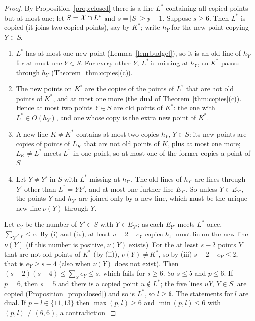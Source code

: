 \begin{proof}
By Proposition~\ref{prop:closed} there is a line $L^*$ containing all copied points but at most one; let
$S = \mathcal{X} \cap L^*$ and $s = |S| \ge p-1$. Suppose $s \ge 6$. Then $L^*$ is copied (it joins two copied points),
say by $K^*$; write $h_Y$ for the new point copying $Y \in S$.
\begin{enumerate}[label=(\roman*)]
\item $L^*$ has at most one new point (Lemma~\ref{lem:budget}), so it is an old line of $h_Y$ for at most one $Y \in S$.
For every other $Y$, $L^*$ is missing at $h_Y$, so $K^*$ passes through $h_Y$ (Theorem~\ref{thm:copies}(c)).
\item The new points on $K^*$ are the copies of the points of $L^*$ that are not old points of $K^*$, and at most one
more (the dual of Theorem~\ref{thm:copies}(c)). Hence at most two points $Y \in S$ are old points of $K^*$: the one with
$L^* \in O(h_Y)$, and one whose copy is the extra new point of $K^*$.
\item A new line $K \ne K^*$ contains at most two copies $h_Y$, $Y \in S$: its new points are copies of points of $L_K$
that are not old points of $K$, plus at most one more; $L_K \ne L^*$ meets $L^*$ in one point, so at most one of the
former copies a point of $S$.
\item Let $Y \ne Y'$ in $S$ with $L^*$ missing at $h_{Y'}$. The old lines of $h_{Y'}$ are lines through $Y'$ other than
$L^* = YY'$, and at most one further line $E_{Y'}$. So unless $Y \in E_{Y'}$, the points $Y$ and $h_{Y'}$ are joined only
by a new line, which must be the unique new line $\nu(Y)$ through $Y$.
\end{enumerate}
Let $e_Y$ be the number of $Y' \in S$ with $Y \in E_{Y'}$; as each $E_{Y'}$ meets $L^*$ once, $\sum_Y e_Y \le s$.
By (i) and (iv), at least $s - 2 - e_Y$ copies $h_{Y'}$ must lie on the new line $\nu(Y)$ (if this number is positive,
$\nu(Y)$ exists). For the at least $s-2$ points $Y$ that are not old
points of $K^*$ (by (ii)), $\nu(Y) \ne K^*$, so by (iii) $s - 2 - e_Y \le 2$, that is $e_Y \ge s-4$ (also when $\nu(Y)$ does not exist). Then
$(s-2)(s-4) \le \sum_Y e_Y \le s$, which fails for $s \ge 6$. So $s \le 5$ and $p \le 6$.
If $p = 6$, then $s = 5$ and there is a copied point $u \notin L^*$; the five lines $uY$, $Y \in S$, are copied
(Proposition~\ref{prop:closed}) and so is $L^*$, so $l \ge 6$. The statements for $l$ are dual. If $p + l \in \{11,13\}$
then $\max(p,l) \ge 6$ and $\min(p,l) \le 6$ with $(p,l) \ne (6,6)$, a contradiction.
\end{proof}

